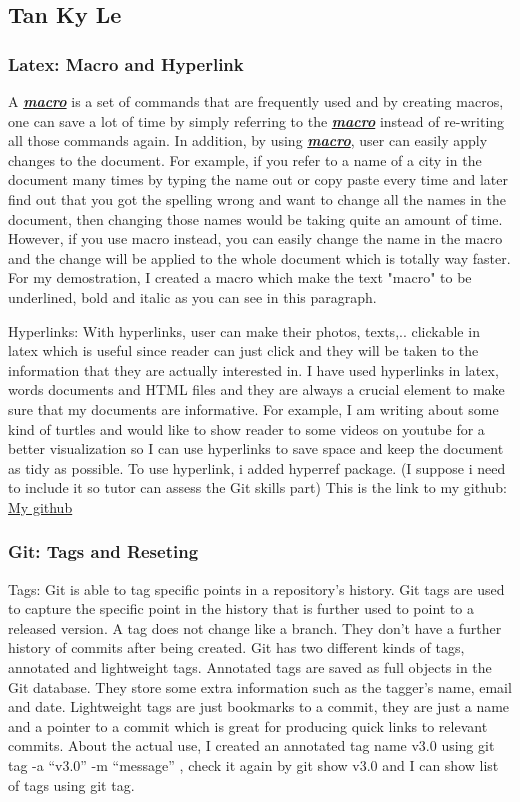 \documentclass[a4paper, 11pt]{report}
\begin{document}
\subsection{Tan Ky Le}

\subsubsection{ Latex: Macro and Hyperlink}
\newcommand{\BoldandItalic}[0]{\textbf{\textit{ \underline{macro}}}}

A\BoldandItalic{} is a set of commands that are frequently used and by creating macros, one can save a lot of time by simply referring to the\BoldandItalic{} instead of re-writing all those commands again. In addition, by using\BoldandItalic{}, user can easily apply changes to the document. For example, if you refer to a name of a city in the document many times by typing the name out or copy paste every time and later find out that you got the spelling wrong and want to change all the names in the document, then changing those names would be taking quite an amount of time. However, if you use macro instead, you can easily change the name in the macro and the change will be applied to the whole document which is totally way faster. For my demostration, I created a macro which make the text "macro" to be underlined, bold and italic  as you can see in this paragraph.

Hyperlinks: With hyperlinks, user can make their photos, texts,.. clickable in latex which is useful since reader can just click and they will be taken to the information that they are actually interested in. I have used hyperlinks in latex, words documents and HTML files and they are always a crucial element to make sure that my documents are informative. For example, I am writing about some kind of turtles and would like to show reader to some videos on youtube for a better visualization so I can use hyperlinks to save space and keep the document as tidy as possible. To use hyperlink, i added hyperref package.
(I suppose i need to include it so tutor can assess the Git skills part) This is the link to my github: \href{https://github.com/Kyle240/testing.git}{My github}

\subsubsection{ Git: Tags and Reseting}

Tags: Git is able to tag specific points in a repository’s history. Git tags are used to capture the specific point in the history that is further used to point to a released version. A tag does not change like a branch. They don’t have a further history of commits after being created. Git has two different kinds of tags, annotated and lightweight tags. Annotated tags are saved as full objects in the Git database. They store some extra information such as the tagger’s name, email and date. Lightweight tags are just bookmarks to a commit, they are just a name and a pointer to a commit which is great for producing quick links to relevant commits. About the actual use, I created an annotated tag name v3.0 using git tag -a “v3.0” -m “message” , check it again by git show v3.0  and I can show list of tags using git tag. 
\end{document}
